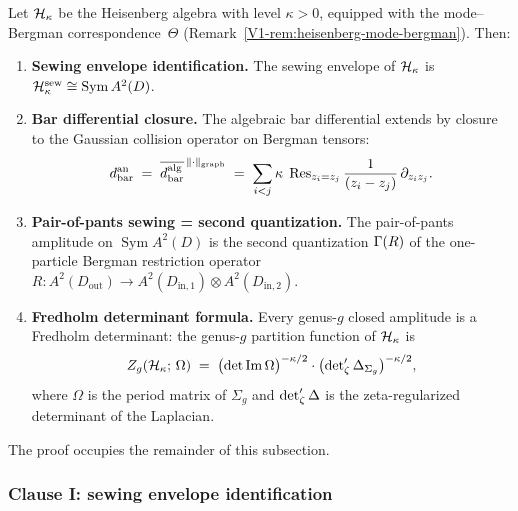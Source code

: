 \begin{theorem}%
\label{thm:thqg-X-heisenberg-sewing-full}%
%
Let $\mathcal{H}_\kappa$ be the Heisenberg algebra with level $\kappa > 0$,
equipped with the mode--Bergman correspondence~$\Theta$
\textup{(}Remark~\textup{\ref{V1-rem:heisenberg-mode-bergman}}\textup{)}.
Then:
\begin{enumerate}[label=\textup{(\Roman*)}]
\item \textbf{Sewing envelope identification.}
 The sewing envelope of $\mathcal{H}_\kappa$ is
 $\mathcal{H}_\kappa^{\mathrm{sew}} \cong
 \operatorname{Sym} A^2(D)$.
\item \textbf{Bar differential closure.}
 The algebraic bar differential extends by closure to the
 Gaussian collision operator on Bergman tensors:
 \begin{equation}%
 d_{\mathrm{bar}}^{\mathrm{an}}
 \;=\;
 \overline{d_{\mathrm{bar}}^{\mathrm{alg}}}
 ^{\,\graphnorm}
 \;=\;
 \sum_{i < j}
 \kappa\;\operatorname{Res}_{z_i = z_j}
 \frac{1}{(z_i - z_j)}\,
 \partial_{z_i z_j}.
 \end{equation}
\item \textbf{Pair-of-pants sewing = second quantization.}
 The pair-of-pants amplitude on
 $\operatorname{Sym} A^2(D)$ is the second quantization
 $\Gamma(R)$ of the one-particle Bergman restriction
 operator
 $R \colon A^2(D_{\mathrm{out}}) \to
 A^2(D_{\mathrm{in},1}) \otimes A^2(D_{\mathrm{in},2})$.
\item \textbf{Fredholm determinant formula.}
 Every genus-$g$ closed amplitude is a Fredholm determinant:
 the genus-$g$ partition function of $\mathcal{H}_\kappa$ is
 \begin{equation}%
 Z_g(\cH_\kappa;\,\Omega)
 \;=\;
 \bigl(\det\operatorname{Im}\Omega\bigr)^{-\kappa/2}
 \cdot
 \bigl(\zetareg\Delta_{\Sigma_g}\bigr)^{-\kappa/2},
 \end{equation}
 where $\Omega$ is the period matrix of $\Sigma_g$ and
 $\det\nolimits'_\zeta\Delta$ is the zeta-regularized determinant of the
 Laplacian.
\end{enumerate}
\end{theorem}

The proof occupies the remainder of this subsection.

\subsubsection{Clause I: sewing envelope identification}

